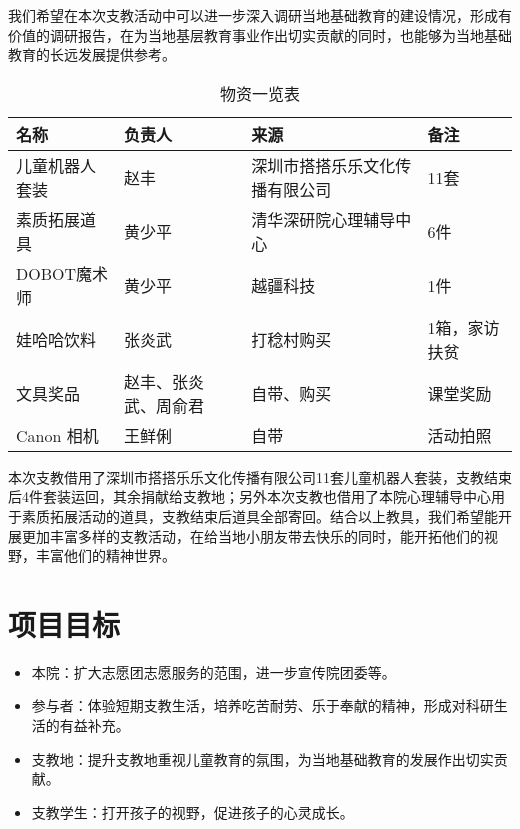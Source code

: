 \documentclass[12pt]{ctexart}
\begin{document}
我们希望在本次支教活动中可以进一步深入调研当地基础教育的建设情况，形成有价值的调研报告，在为当地基层教育事业作出切实贡献的同时，也能够为当地基础教育的长远发展提供参考。
\begin{table}[!ht]
\centering
\begin{tabular}{|p{2cm}|p{2cm}|p{2cm}|p{3cm}|}
\hline
名称 & 负责人 & 来源 & 备注 \\
\hline
儿童机器人套装 & 赵丰 & 深圳市搭搭乐乐文化传播有限公司 & 11套 \\
\hline
素质拓展道具 & 黄少平 & 清华深研院心理辅导中心 & 6件 \\
\hline
DOBOT魔术师 & 黄少平 & 越疆科技 & 1件 \\
\hline
娃哈哈饮料 & 张炎武 & 打稔村购买 & 1箱，家访扶贫 \\
\hline
文具奖品 & 赵丰、张炎武、周俞君 & 自带、购买 & 课堂奖励 \\
\hline
Canon 相机 & 王鲜俐 & 自带 & 活动拍照 \\
\hline
\end{tabular}
\caption{物资一览表}
\end{table}
本次支教借用了深圳市搭搭乐乐文化传播有限公司11套儿童机器人套装，支教结束后4件套装运回，其余捐献给支教地；另外本次支教也借用了本院心理辅导中心用于素质拓展活动的道具，支教结束后道具全部寄回。结合以上教具，我们希望能开展更加丰富多样的支教活动，在给当地小朋友带去快乐的同时，能开拓他们的视野，丰富他们的精神世界。
\section{项目目标}
\begin{itemize}
\item 本院：扩大志愿团志愿服务的范围，进一步宣传院团委等。
\item 参与者：体验短期支教生活，培养吃苦耐劳、乐于奉献的精神，形成对科研生活的有益补充。
\item 支教地：提升支教地重视儿童教育的氛围，为当地基础教育的发展作出切实贡献。
\item 支教学生：打开孩子的视野，促进孩子的心灵成长。
\end{itemize}
\end{document}

